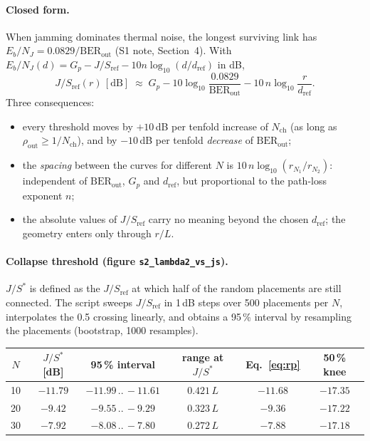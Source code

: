 \documentclass[11pt,a4paper]{article}
\newcommand{\BERout}{\mathrm{BER}_{\mathrm{out}}}
\begin{document}
\paragraph{Closed form.}
When jamming dominates thermal noise, the longest surviving link has
$E_b/N_J = 0.0829/\BERout$ (S1 note, Section~4). With
$E_b/N_J(d) = G_p - J/S_{\mathrm{ref}} - 10n\log_{10}(d/d_{\mathrm{ref}})$ in dB,
\begin{equation}
  J/S_{\mathrm{ref}}(r)\,[\mathrm{dB}] \;\approx\; G_p
  - 10\log_{10}\!\frac{0.0829}{\BERout}
  - 10\,n\log_{10}\!\frac{r}{d_{\mathrm{ref}}} .
  \label{eq:rp}
\end{equation}
Three consequences:
\begin{itemize}[nosep]
  \item every threshold moves by $+10$\,dB per tenfold increase of
        $N_{\mathrm{ch}}$ (as long as $\rho_{\mathrm{out}}\ge1/N_{\mathrm{ch}}$),
        and by $-10$\,dB per tenfold \emph{decrease} of $\BERout$;
  \item the \emph{spacing} between the curves for different $N$ is
        $10\,n\log_{10}(r_{N_1}/r_{N_2})$: independent of $\BERout$, $G_p$ and
        $d_{\mathrm{ref}}$, but proportional to the path-loss exponent $n$;
  \item the absolute values of $J/S_{\mathrm{ref}}$ carry no meaning beyond the
        chosen $d_{\mathrm{ref}}$; the geometry enters only through $r/L$.
\end{itemize}

\paragraph{Collapse threshold (figure \texttt{s2\_lambda2\_vs\_js}).}
$J/S^\ast$ is defined as the $J/S_{\mathrm{ref}}$ at which half of the random
placements are still connected. The script sweeps $J/S_{\mathrm{ref}}$ in 1\,dB
steps over 500 placements per $N$, interpolates the 0.5 crossing linearly, and
obtains a 95\,\% interval by resampling the placements (bootstrap, 1000
resamples).

\begin{center}
\begin{tabular}{@{}cccccc@{}}
\toprule
$N$ & $J/S^\ast$ [dB] & 95\,\% interval & range at $J/S^\ast$ & Eq.~\eqref{eq:rp} & 50\,\% knee \\
\midrule
10 & $-11.79$ & $-11.99\,..\,-11.61$ & $0.421\,L$ & $-11.68$ & $-17.35$ \\
20 & $-9.42$  & $-9.55\,..\,-9.29$   & $0.323\,L$ & $-9.36$  & $-17.22$ \\
30 & $-7.92$  & $-8.08\,..\,-7.80$   & $0.272\,L$ & $-7.88$  & $-17.18$ \\
\bottomrule
\end{tabular}
\end{center}
\end{document}

